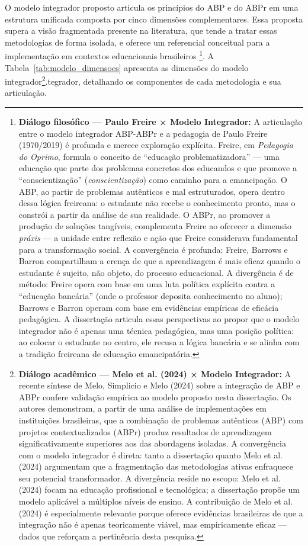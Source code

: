 O modelo integrador proposto articula os princípios do ABP e do ABPr em uma estrutura unificada composta por cinco dimensões complementares. Essa proposta supera a visão fragmentada presente na literatura, que tende a tratar essas metodologias de forma isolada, e oferece um referencial conceitual para a implementação em contextos educacionais brasileiros \cite{TEODORO2024, MELO2024}\footnote{\textbf{Diálogo filosófico — Paulo Freire × Modelo Integrador:} A articulação entre o modelo integrador ABP-ABPr e a pedagogia de Paulo Freire (1970/2019) é profunda e merece exploração explícita. Freire, em \textit{Pedagogia do Oprimo}, formula o conceito de ``educação problematizadora'' — uma educação que parte dos problemas concretos dos educandos e que promove a ``conscientização'' (\textit{conscientização}) como caminho para a emancipação. O ABP, ao partir de problemas autênticos e mal estruturados, opera dentro dessa lógica freireana: o estudante não recebe o conhecimento pronto, mas o constrói a partir da análise de sua realidade. O ABPr, ao promover a produção de soluções tangíveis, complementa Freire ao oferecer a dimensão \textit{práxis} — a unidade entre reflexão e ação que Freire considerava fundamental para a transformação social. A convergência é profunda: Freire, Barrows e Barron compartilham a crença de que a aprendizagem é mais eficaz quando o estudante é sujeito, não objeto, do processo educacional. A divergência é de método: Freire opera com base em uma luta política explícita contra a ``educação bancária'' (onde o professor deposita conhecimento no aluno); Barrows e Barron operam com base em evidências empíricas de eficácia pedagógica. A dissertação articula essas perspectivas ao propor que o modelo integrador não é apenas uma técnica pedagógica, mas uma posição política: ao colocar o estudante no centro, ele recusa a lógica bancária e se alinha com a tradição freireana de educação emancipatória.}. A Tabela~\ref{tab:modelo_dimensoes} apresenta as dimensões do modelo integrador\footnote{\textbf{Diálogo acadêmico — Melo et al. (2024) × Modelo Integrador:} A recente síntese de Melo, Simplicio e Melo (2024) sobre a integração de ABP e ABPr confere validação empírica ao modelo proposto nesta dissertação. Os autores demonstram, a partir de uma análise de implementações em instituições brasileiras, que a combinação de problemas autênticos (ABP) com projetos contextualizados (ABPr) produz resultados de aprendizagem significativamente superiores aos das abordagens isoladas. A convergência com o modelo integrador é direta: tanto a dissertação quanto Melo et al. (2024) argumentam que a fragmentação das metodologias ativas enfraquece seu potencial transformador. A divergência reside no escopo: Melo et al. (2024) focam na educação profissional e tecnológica; a dissertação propõe um modelo aplicável a múltiplos níveis de ensino. A contribuição de Melo et al. (2024) é especialmente relevante porque oferece evidências brasileiras de que a integração não é apenas teoricamente viável, mas empiricamente eficaz — dados que reforçam a pertinência desta pesquisa.}.tegrador, detalhando os componentes de cada metodologia e sua articulação.

